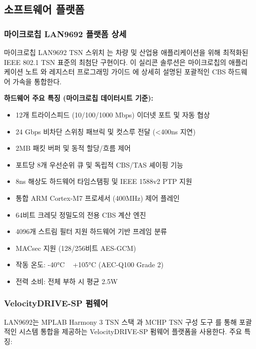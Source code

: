 \documentclass[twocolumn,10pt]{article}
\begin{document}
\subsection{소프트웨어 플랫폼}

\subsubsection{마이크로칩 LAN9692 플랫폼 상세}

마이크로칩 LAN9692 TSN 스위치 \cite{microchip2024lan9692}는 차량 및 산업용 애플리케이션을 위해 최적화된 IEEE 802.1 TSN 표준의 최첨단 구현이다. 이 실리콘 솔루션은 마이크로칩의 애플리케이션 노트 \cite{microchip2024cbs_app}와 레지스터 프로그래밍 가이드 \cite{microchip2023register}에 상세히 설명된 포괄적인 CBS 하드웨어 가속을 통합한다.

\textbf{하드웨어 주요 특징 (마이크로칩 데이터시트 \cite{microchip2024lan9692} 기준):}
\begin{itemize}
    \item 12개 트라이스피드 (10/100/1000 Mbps) 이더넷 포트 및 자동 협상
    \item 24 Gbps 비차단 스위칭 패브릭 및 컷스루 전달 (<400ns 지연)
    \item 2MB 패킷 버퍼 및 동적 할당/흐름 제어
    \item 포트당 8개 우선순위 큐 및 독립적 CBS/TAS 셰이핑 기능
    \item 8ns 해상도 하드웨어 타임스탬핑 및 IEEE 1588v2 PTP 지원
    \item 통합 ARM Cortex-M7 프로세서 (400MHz) 제어 플레인
    \item 64비트 크레딧 정밀도의 전용 CBS 계산 엔진
    \item 4096개 스트림 필터 지원 하드웨어 기반 프레임 분류
    \item MACsec 지원 (128/256비트 AES-GCM) \cite{microchip2024security}
    \item 작동 온도: -40°C ~ +105°C (AEC-Q100 Grade 2)
    \item 전력 소비: 전체 부하 시 평균 2.5W \cite{microchip2024power}
\end{itemize}

\subsubsection{VelocityDRIVE-SP 펌웨어}

LAN9692는 MPLAB Harmony 3 TSN 스택 \cite{microchip2024harmony}과 MCHP TSN 구성 도구 \cite{microchip2023configurator}를 통해 포괄적인 시스템 통합을 제공하는 VelocityDRIVE-SP 펌웨어 플랫폼을 사용한다. 주요 특징:
\end{document}
